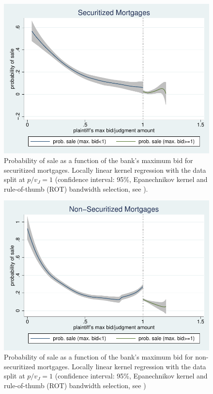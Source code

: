 \documentclass[11pt,twopage]{article}
\begin{document}
\begin{figure}[tbp]
	\centering
	\includegraphics[width=0.6 \textwidth]{graphics/discontinuity_securitized}
	\caption{Probability of sale as a function of the bank's maximum bid for securitized mortgages. Locally linear kernel regression with the data split at $p/v_J=1$ (confidence interval: 95\%, Epanechnikov kernel and rule-of-thumb (ROT) bandwidth selection, see \cite{fan1996local}).}
	\label{fig:probability-of-sale-securitized}
\end{figure}

\begin{figure}[tbp]
	\centering
	\includegraphics[width=0.6 \textwidth]{graphics/discontinuity_nonsecuritized}
	\caption{Probability of sale as a function of the bank's maximum bid for non-securitized mortgages. Locally linear kernel regression with the data split at $p/v_J=1$ (confidence interval: 95\%, Epanechnikov kernel and rule-of-thumb (ROT) bandwidth selection, see \cite{fan1996local})}
	\label{fig:probability-of-sale-nonsecuritized}        
\end{figure}
\end{document}
